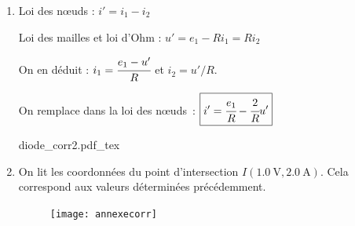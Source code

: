\documentclass[a4paper, 10pt, garamond, oneside]{book}
\begin{document}
{\begin{enumerate}
		      On remarque que $u_D>u_s$, donc la diode est bien passante.

		      Pour trouver $i_D$ on utilise la caractéristique de la diode~:
		      \[
			      \boxed{i_D=au_D+b=5\times 0,67-3=\SI{2.0}{\ampere}}
		      \]

		\item Loi des nœuds : $i'=i_1-i_2$

		      Loi des mailles et loi d'Ohm : $u'=e_1-Ri_1=Ri_2$

		      On en déduit : $i_1=\cfrac{e_1-u'}{R}$ et $i_2=u'/R$.

		      On remplace dans la loi des nœuds~:
		      $\boxed{i'=\cfrac{e_1}{R}-\cfrac{2}{R}u'}$

		      \begin{center}
			      {diode_corr2.pdf_tex}
		      \end{center}
		\item On lit les coordonnées du point d'intersection
		      $I(\SI{1.0}{\volt},\SI{2.0}{\ampere})$. Cela correspond aux valeurs
		      déterminées précédemment.
		      \begin{figure}[htbp]
			      \centering
			      \texttt{[image: annexecorr]}
		      \end{figure}
	\end{enumerate}
}

\newpage
\end{document}
